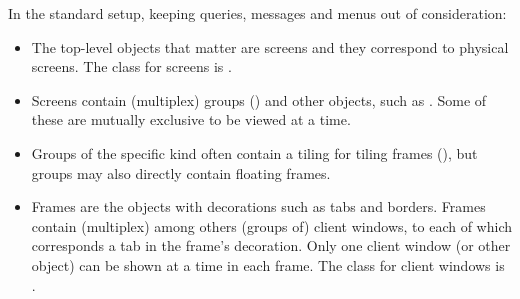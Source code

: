 In the standard setup, keeping queries, messages and menus out of
consideration:

\begin{itemize}
  \item The top-level objects that matter are screens and they correspond
    to physical screens. The class for screens is .
  \item Screens contain (multiplex) groups () and other 
    objects, such as . Some of these are mutually exclusive
    to be viewed at a time.
  \item Groups of the specific kind  often contain a
     tiling for tiling frames (), but 
    groups may also directly contain floating frames.
  \item Frames are the objects with decorations such as tabs and borders.
    Frames contain (multiplex) among others (groups of) client windows, 
    to each of which corresponds a tab in the frame's decoration. Only 
    one client window (or other object) can be shown at a time in each 
    frame. The class for client windows is .
\end{itemize}

